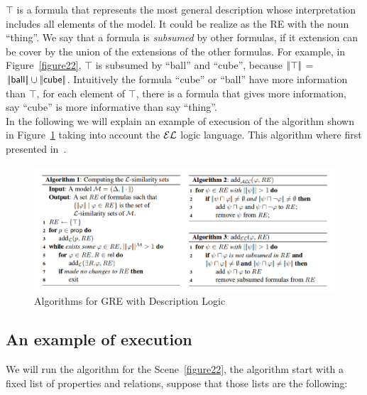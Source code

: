 $\top$ is a formula that represents the most general description whose
interpretation includes all elements of the model. It could be realize
as the RE with the noun ``\textsf{thing}''. We say that a formula is
\emph{subsumed} by other formulas, if it extension can be cover by the
union of the extensions of the other formulas. For example, in
Figure~\ref{figure22}, $\top$ is subsumed by ``\textsf{ball}'' and
``\textsf{cube}'', because $|\!|\top|\!|$ = $|\!|\textsf{ball}|\!|
\cup |\!|\textsf{cube}|\!|$.
Intuitively the formula ``\textsf{cube}'' or ``\textsf{ball}'' have more information than $\top$, for each element of $\top$, there is a formula that gives more information, say ``\textsf{cube}'' is more informative than say ``\textsf{thing}''.\\

In the following we will explain an example of execusion of the
algorithm shown in Figure~\ref{algoritmoOriginal} taking into account
the $\mathcal{EL}$ logic language. This algorithm where first presented
in~\cite{arec2:2008:Areces}.

\begin{figure}[h!]
\begin{center}
\includegraphics[width=\textwidth]{images/algoritmoOriginal.png}
\end{center}
\vspace*{-2em}
\caption{Algorithms for GRE with Description Logic}
\label{algoritmoOriginal}
\end{figure}

\subsection{An example of execution}

We will run the algorithm for the Scene~\ref{figure22}, the algorithm
start with a fixed list of properties and relations, suppose that
those lists are the following:

